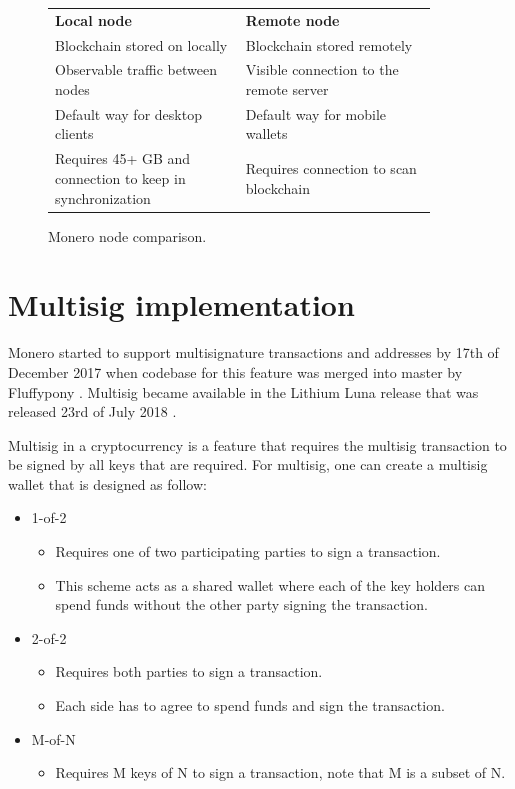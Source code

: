 \documentclass[
  printed, %
  table,   %
  lof,     %
  lot,     %
           oneside, color
]{fithesis3}
\begin{document}
\begin{figure}[H]
\center
\begin{tabular}{p{0.45\linewidth}p{0.45\linewidth}}
\textbf{Local node}                                                          & \textbf{Remote node}                                \\
Blockchain stored on locally                                           & Blockchain stored remotely                          \\
Observable traffic between nodes                                             & Visible connection to the remote server                 \\
Default way for desktop clients                                              & Default way for mobile wallets \\
Requires 45+ GB and connection to keep in synchronization                               & Requires connection to scan blockchain             
\end{tabular}
\caption{Monero node comparison.}
\label{table:moneronodes}
\end{figure}
\newpage
\section{Multisig implementation}

Monero started to support multisignature transactions and addresses by 17th of December 2017 when codebase for this feature was merged into master by Fluffypony \cite{moneromultisig}. Multisig became available in the Lithium Luna release that was released 23rd of July 2018 \cite{moneromultisigrelease}.

Multisig in a cryptocurrency is a feature that requires the multisig transaction to be signed by all keys that are required. For multisig, one can create a multisig wallet that is designed as follow:
\begin{itemize}\itemsep0em
\item 1-of-2 
\begin{itemize}\itemsep0em \item Requires one of two participating parties to sign a transaction. \item This scheme acts as a shared wallet where each of the key holders can spend funds without the other party signing the transaction. \end{itemize}
\item 2-of-2 \begin{itemize}\itemsep0em \item  Requires both parties to sign a transaction. \item Each side has to agree to spend funds and sign the transaction.\end{itemize}
\item M-of-N \begin{itemize}\itemsep0em \item  Requires M keys of N to sign a transaction, note that M is a subset of N. \end{itemize}
\end{itemize}
\end{document}
